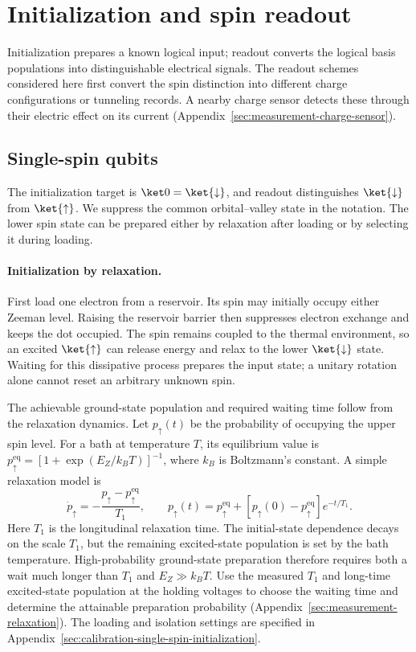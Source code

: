\section{Initialization and spin readout}
\label{sec:initialization-readout}

Initialization prepares a known logical input; readout converts the
logical basis populations into distinguishable electrical signals.
The readout schemes considered here first convert the spin
distinction into different charge configurations or tunneling
records. A nearby charge sensor detects these through their
electric effect on its current (Appendix~\ref{sec:measurement-charge-sensor}).

\subsection{Single-spin qubits}
\label{sec:single-spin-spam}
\label{sec:spin-initialization}

The initialization target is $\ket0=\ket{\downarrow}$, and readout
distinguishes $\ket{\downarrow}$ from $\ket{\uparrow}$.
We suppress the common orbital--valley state in the notation.
The lower spin state can be prepared either by relaxation after
loading or by selecting it during loading.

\paragraph{Initialization by relaxation.}
First load one electron from a reservoir. Its spin may initially
occupy either Zeeman level. Raising the reservoir barrier then
suppresses electron exchange and keeps the dot occupied.
The spin remains coupled to the thermal environment, so an excited
$\ket{\uparrow}$ can release energy and relax to the lower
$\ket{\downarrow}$ state. Waiting for this dissipative process
prepares the input state; a unitary rotation alone cannot reset an
arbitrary unknown spin.

The achievable ground-state population and required waiting time
follow from the relaxation dynamics. Let $p_\uparrow(t)$ be the
probability of occupying the upper spin level.
For a bath at temperature $T$, its equilibrium value is
$p_\uparrow^{\mathrm{eq}}=[1+\exp(E_Z/k_BT)]^{-1}$, where $k_B$
is Boltzmann's constant. A simple relaxation model is
\begin{equation}
  \dot p_\uparrow=-\frac{p_\uparrow-p_\uparrow^{\mathrm{eq}}}{T_1},
  \qquad
  p_\uparrow(t)=p_\uparrow^{\mathrm{eq}}
       +[p_\uparrow(0)-p_\uparrow^{\mathrm{eq}}]e^{-t/T_1}.
  \label{eq:thermal-spin-initialization}
\end{equation}
Here $T_1$ is the longitudinal relaxation time.
The initial-state dependence decays on the scale $T_1$, but the
remaining excited-state population is set by the bath temperature.
High-probability ground-state preparation therefore requires both
a wait much longer than $T_1$ and $E_Z\gg k_BT$.
Use the measured $T_1$ and long-time excited-state population at the
holding voltages to choose the waiting time and determine the
attainable preparation probability
(Appendix~\ref{sec:measurement-relaxation}). The loading and isolation
settings are specified in
Appendix~\ref{sec:calibration-single-spin-initialization}.

